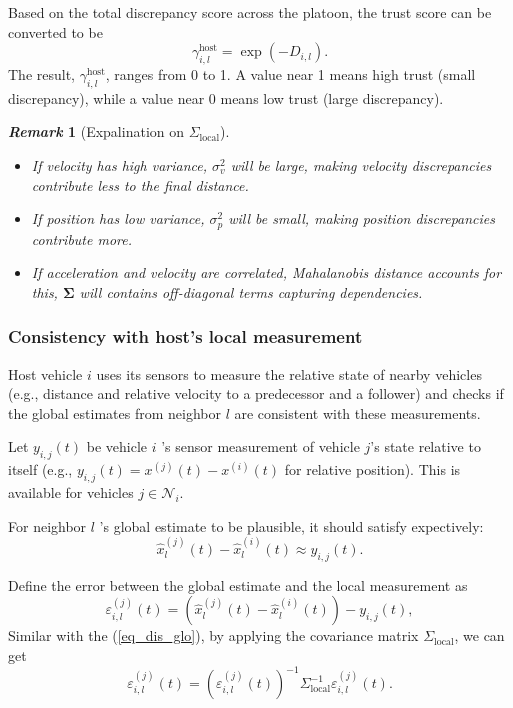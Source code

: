 \documentclass[letterpaper, 10pt, conference]{ieeeconf}  %
\def\eqref#1{(\ref{#1})}
\def\N{\mathcal{N}} %
\newtheorem{remark}{\it Remark}%
\begin{document}
Based on the total discrepancy score across the platoon, the trust score can be converted to be 
\begin{equation}
    \gamma_{i,l}^{\text{host}} = \exp\left( -{D_{i,l}} \right).
\end{equation}
The result,  $\gamma_{i,l}^{\text{host}}$, ranges from 0 to 1. A value near 1 means high trust (small discrepancy), while a value near 0 means low trust (large discrepancy).

\begin{remark}[Expalination on $\Sigma_{\text{local}}$]

\begin{itemize}
    \item If velocity has high variance, \( \sigma^2_v \) will be large, making velocity discrepancies contribute less to the final distance.
    \item If position has low variance, \( \sigma^2_p \) will be small, making position discrepancies contribute more.
    \item If acceleration and velocity are correlated, Mahalanobis distance accounts for this, \( \mathbf{\Sigma} \) will contains off-diagonal terms capturing dependencies.
\end{itemize}
\end{remark}

\subsubsection{Consistency with host's local measurement}
Host vehicle  $i$  uses its sensors to measure the relative state of nearby vehicles (e.g., distance and relative velocity to a predecessor and a follower) and checks if the global estimates from neighbor  $l$  are consistent with these measurements.

Let $y_{i,j}(t)$ be vehicle  $i$ 's sensor measurement of vehicle $ j $'s state relative to itself (e.g., $ y_{i,j}(t) = x^{(j)}(t) - x^{(i)}(t) $ for relative position). This is available for vehicles $ j \in \N_i$. 

For neighbor $l$ 's global estimate to be plausible, it should satisfy expectively:
\begin{equation*}
    \hat{x}_l^{(j)}(t) - \hat{x}_l^{(i)}(t) \approx y_{i,j}(t).
\end{equation*}

Define the error between the global estimate and the local measurement as
\begin{equation}
    \varepsilon_{i,l}^{(j)}(t) = \left( \hat{x}_l^{(j)}(t) - \hat{x}_l^{(i)}(t) \right) - y_{i,j}(t), 
\end{equation}
Similar with the \eqref{eq_dis_glo}, by applying the covariance matrix $\Sigma_{\text{local}}$, we can get 
\begin{equation}
    \varepsilon_{i,l}^{(j)}(t) = (\varepsilon_{i,l}^{(j)}(t))^{-1} \Sigma_{\text{local}}^{-1} \varepsilon_{i,l}^{(j)}(t).
\end{equation}
\end{document}
